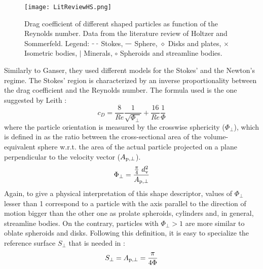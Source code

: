 		\begin{figure}
			\centering
			\texttt{[image: LitReviewHS.png]}
			\caption[Drag coefficient of different shaped particles as function of the Reynolds number.]{Drag coefficient of different shaped particles as function of the Reynolds number. Data from the literature review of Holtzer and Sommerfeld. \cite{HoltzerSommerfeld-2008}
			Legend: $ \tikz[baseline] {\draw[dashed] (0,.7ex)--(.3,.7ex) ;} $ Stokes, 
			$ \tikz[baseline] {\draw (0,.7ex)--(.3,.7ex) ;} $ Sphere,
			$ \diamond $ Disks and plates, $ \times $ Isometric bodies, $ | $ Minerals, $ \circ $ Spheroids and streamline bodies.}
			\label{fig: LitReviewHS}
		\end{figure}

		Similarly to Ganser, they used different models for the Stokes' and the Newton's regime. The Stokes' region is characterized by an inverse proportionality between the drag coefficient and the Reynolds number. The formula used is the one suggested by Leith \cite{Leith-1987}:
		\begin{equation}
			c_D = \frac{8}{Re} \frac{1}{\sqrt{\Phi_{\perp}}} + \frac{16}{Re} \frac{1}{\Phi}
			\label{eq: Leith}
		\end{equation}
		where the particle orientation is measured by the crosswise sphericity ($ \Phi_{\perp} $), which is defined in  as the ratio between the cross-sectional area of the volume-equivalent sphere w.r.t. the area of the actual particle projected on a plane perpendicular to the velocity vector ($ A_{\textup{p}, \perp} $).
		\begin{equation}
			\Phi_{\perp} = \dfrac{\frac{\pi}{4}\ d_{\textup{v}}^2} {A_{\textup{p}, \perp}}
			\label{eq: Crosswise}
		\end{equation}
		Again, to give a physical interpretation of this shape descriptor, values of $ \Phi_{\perp} $ lesser than 1 correspond to a particle with the axis parallel to the direction of motion bigger than the other one as prolate spheroids, cylinders and, in general, streamline bodies. On the contrary, particles with $ \Phi_{\perp} > 1 $ are more similar to oblate spheroids and disks.
		Following this definition, it is easy to specialize the reference surface $ S_{\perp} $ that is needed in :
		\begin{equation}
			S_{\perp} = A_{\textup{p}, \perp} = \dfrac{\pi}{4 \Phi}
			\label{eq: areaHS}
		\end{equation}
		
